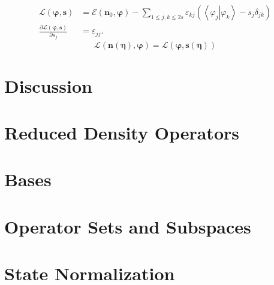 \documentclass[aps,preprint]{revtex4}%
\begin{document}
\begin{align}
\mathcal{L}\left(  \mathbf{\varphi,s}\right)   &  =\mathcal{E}\left(
\mathbf{n}_{0}\mathbf{,\varphi}\right)  -\sum_{1\leq j,k\leq2s}\varepsilon
_{kj}\left(  \left\langle \left.  \varphi_{j}\right\vert \varphi
_{k}\right\rangle -s_{j}\delta_{jk}\right) \\
\frac{\partial\mathcal{L}\left(  \mathbf{\varphi,s}\right)  }{\partial s_{j}}
&  =\varepsilon_{jj}.
\end{align}%
\begin{equation}
\mathcal{L}\left(  \mathbf{n\left(  \mathbf{\eta}\right)  ,\varphi}\right)
=\mathcal{L}\left(  \mathbf{\varphi,s}\left(  \mathbf{\eta}\right)  \right)
\end{equation}


\section{\bigskip Discussion}

\appendix

\section{Reduced Density Operators \label{Denmat}}

\bigskip

\section{Bases \label{Bases}}

\bigskip

\section{Operator Sets and Subspaces \label{Operators}}

\bigskip

\section{State Normalization \label{Normalization}}
\end{document}
